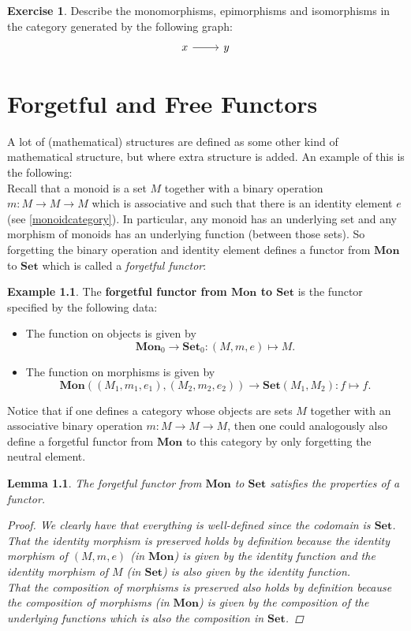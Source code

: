 \documentclass[a4paper,11pt, oneside,titlepage=false]{scrbook}
\theoremstyle{plain}
\newtheorem{lemma}[thm]{Lemma}
\theoremstyle{definition}
\newtheorem{exa}[thm]{Example}
\newtheorem{exer}[thm]{Exercise}
\newcommand{\Catb}[1]{\mathbf{#1}}
\newcommand{\SET}{\Catb{Set}}
\newcommand{\MON}{\Catb{Mon}}
\newcommand{\Ob}[1]{{#1}_0}
\newcommand{\CHom}[3]{{#1}(#2,#3)}
\begin{document}
\begin{exer} Describe the monomorphisms, epimorphisms and isomorphisms in the category generated by the following graph:
\[
\begin{tikzcd}
x \arrow[r] & y
\end{tikzcd}
\]
\end{exer}


\chapter{Forgetful and Free Functors}
\label{ch:forgetful-free}

A lot of (mathematical) structures are defined as some other kind of mathematical structure, but where extra structure is added. An example of this is the following:\\
Recall that a monoid is a set $M$ together with a binary operation $m:M\to M\to M$ which is associative and such that there is an identity element $e$ (see \cref{monoidcategory}). In particular, any monoid has an underlying set and any morphism of monoids has an underlying function (between those sets). So forgetting the binary operation and identity element defines a functor from $\MON$ to $\SET$ which is called a \textit{forgetful functor}:
\begin{exa}\label{example:forgetful_montoset} The \textbf{forgetful functor from $\MON$ to $\SET$} is the functor specified by the following data:
\begin{itemize}
\item The function on objects is given by
\[
\Ob{\MON}\to \Ob{\SET}: (M,m,e)\mapsto M.
\]
\item The function on morphisms is given by
\[
\CHom{\MON}{(M_1,m_1,e_1)}{(M_2,m_2,e_2)} \to \CHom{\SET}{M_1}{M_2} : f\mapsto f.
\]
\end{itemize}
\end{exa}
Notice that if one defines a category whose objects are sets $M$ together with an associative binary operation $m:M\to M\to M$, then one could analogously also define a forgetful functor from $\MON$ to this category by only forgetting the neutral element.

\begin{lemma} The forgetful functor from $\MON$ to $\SET$ satisfies the properties of a functor.
\begin{proof}
We clearly have that everything is well-defined since the codomain is $\SET$.\\
That the identity morphism is preserved holds by definition because the identity morphism of $(M,m,e)$ (in $\MON$) is given by the identity function and the identity morphism of $M$ (in $\SET$) is also given by the identity function.\\
That the composition of morphisms is preserved also holds by definition because the composition of morphisms (in $\MON$) is given by the composition of the underlying functions which is also the composition in $\SET$.
\end{proof}
\end{lemma}
\end{document}
